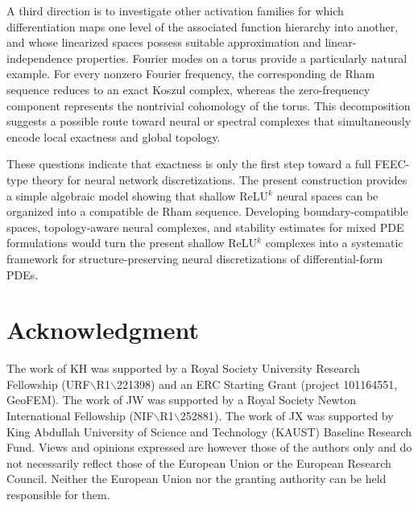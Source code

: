 \documentclass[pdflatex,sn-mathphys-num]{sn-jnl}
\numberwithin{equation}{section}
\numberwithin{theorem}{section}
\numberwithin{table}{section}
\numberwithin{figure}{section}
\begin{document}
A third direction is to investigate other activation families for which differentiation maps one level of the associated function hierarchy into another, and whose linearized spaces possess suitable approximation and linear-independence properties. Fourier modes on a torus provide a particularly natural example. For every nonzero Fourier frequency, the corresponding de Rham sequence reduces to an exact Koszul complex, whereas the zero-frequency component represents the nontrivial cohomology of the torus. This decomposition suggests a possible route toward neural or spectral complexes that simultaneously encode local exactness and global topology.

These questions indicate that exactness is only the first step toward a full FEEC-type theory for neural network discretizations.  The present construction provides a simple algebraic model showing that shallow ReLU$^k$ neural spaces can be organized into a compatible de Rham sequence.  Developing boundary-compatible spaces, topology-aware neural complexes, and stability estimates for mixed PDE formulations would turn the present shallow ReLU$^k$ complexes into a systematic framework for structure-preserving neural discretizations of differential-form PDEs.


\section*{Acknowledgment}
The work of KH was supported by a Royal Society University Research Fellowship (URF$\backslash$R1$\backslash$221398) and an ERC Starting Grant (project 101164551, GeoFEM). The work of JW was supported by a Royal Society Newton International Fellowship (NIF$\backslash$R1$\backslash$252881). The work of JX was supported by King Abdullah University of Science and Technology (KAUST) Baseline Research Fund. Views and opinions expressed are however those of the authors only and do not necessarily reflect those of the European Union or the European Research Council. Neither the European Union nor the granting authority can be held responsible for them.


\end{document}
